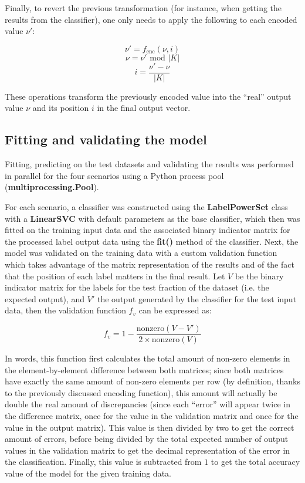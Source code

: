 \documentclass{kthreport}
\theoremstyle{definition}
\begin{document}
Finally, to revert the previous transformation (for instance, when getting the results from the classifier), one only needs to apply the following to each encoded value $\nu'$:

\[ \nu' = f_{\text{enc}}(\nu, i) \]
\[ \nu = \nu' \text{ mod } |K| \]
\[ i = \frac{\nu' - \nu}{|K|} \]

These operations transform the previously encoded value into the ``real'' output value $\nu$ and its position $i$ in the final output vector.

\subsection{Fitting and validating the model}

Fitting, predicting on the test datasets and validating the results was performed in parallel for the four scenarios using a Python process pool (\textbf{multiprocessing.Pool}). 

For each scenario, a classifier was constructed using the \textbf{LabelPowerSet} class with a \textbf{LinearSVC} with default parameters as the base classifier, which then was fitted on the training input data and the associated binary indicator matrix for the processed label output data using the \textbf{fit()} method of the classifier.
Next, the model was validated on the training data with a custom validation function which takes advantage of the matrix representation of the results and of the fact that the position of each label matters in the final result. Let $V$ be the binary indicator matrix for the labels for the test fraction of the dataset (i.e. the expected output), and $V'$ the output generated by the classifier for the test input data, then the validation function $f_{v}$ can be expressed as:

\[ f_{v} = 1 - \frac{\text{nonzero}(V - V')}{2 \times \text{nonzero}(V)} \]

In words, this function first calculates the total amount of non-zero elements in the element-by-element difference between both matrices; since both matrices have exactly the same amount of non-zero elements per row (by definition, thanks to the previously discussed encoding function), this amount will actually be double the real amount of discrepancies (since each ``error'' will appear twice in the difference matrix, once for the value in the validation matrix and once for the value in the output matrix).
This value is then divided by two to get the correct amount of errors, before being divided by the total expected number of output values in the validation matrix to get the decimal representation of the error in the classification.
Finally, this value is subtracted from $1$ to get the total accuracy value of the model for the given training data. 
\end{document}
